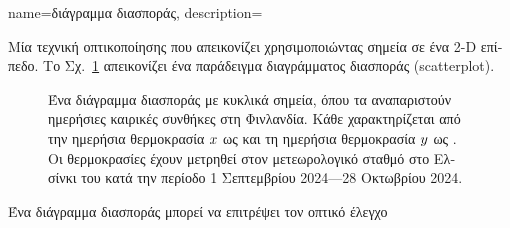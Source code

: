 {name={\foreignlanguage{greek}{διάγραμμα διασποράς}}, 
	description={\foreignlanguage{greek}{Μία} 
		\foreignlanguage{greek}{τεχνική οπτικοποίησης που απεικονίζει}  \foreignlanguage{greek}{χρησιμοποιώντας 
		σημεία σε ένα} 2-D \foreignlanguage{greek}{επίπεδο. Το Σχ.}\ \ref{fig_scatterplot_temp_FMI_dict} \foreignlanguage{greek}{απεικονίζει 
		ένα παράδειγμα διαγράμματος διασποράς} (scatterplot).   
		\begin{figure}[H]
			\begin{center}
				\vspace*{-10mm}
			\end{center}
		{
		\caption{\foreignlanguage{greek}{Ένα διάγραμμα διασποράς με κυκλικά σημεία, όπου τα}  
			\foreignlanguage{greek}{αναπαριστούν ημερήσιες καιρικές συνθήκες στη Φινλανδία. Κάθε} 
			 \foreignlanguage{greek}{χαρακτηρίζεται από την}  
			\foreignlanguage{greek}{ημερήσια θερμοκρασία $x$ ως}  \foreignlanguage{greek}{και τη} 
			 \foreignlanguage{greek}{ημερήσια θερμοκρασία $y$ ως} . 
			\foreignlanguage{greek}{Οι θερμοκρασίες έχουν μετρηθεί στον μετεωρολογικό σταθμό}  
			\foreignlanguage{greek}{στο Ελσίνκι του}  \foreignlanguage{greek}{κατά την περίοδο 
			1 Σεπτεμβρίου 2024—28 Οκτωβρίου 2024.} }
			\label{fig_scatterplot_temp_FMI_dict}}
		\vspace*{-3mm}
		\end{figure}
		\foreignlanguage{greek}{Ένα διάγραμμα διασποράς μπορεί να επιτρέψει τον οπτικό έλεγχο}  
}}
